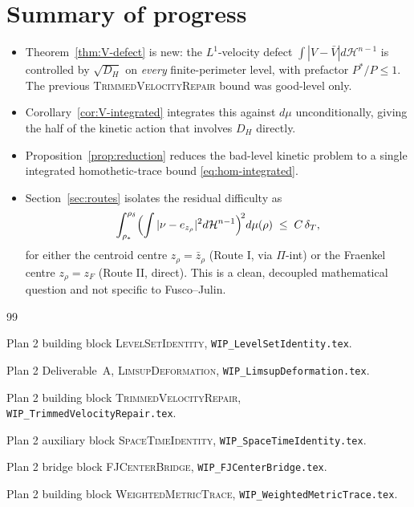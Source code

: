 \documentclass[11pt]{article}
\theoremstyle{definition}
\newcommand{\rstar}{\rho_{*}}
\newcommand{\rdel}{\rho_\delta}
\newcommand{\Hn}{\mathcal H^{n-1}}
\begin{document}
\section{Summary of progress}\label{sec:summary}

\begin{itemize}
\item Theorem~\ref{thm:V-defect} is new: the $L^{1}$-velocity defect
$\int|V-\bar V|d\Hn$ is controlled by $\sqrt{D_H}$ on \emph{every}
finite-perimeter level, with prefactor $P^{*}/P\le 1$.  The previous
\textsc{TrimmedVelocityRepair} bound was good-level only.
\item Corollary~\ref{cor:V-integrated} integrates this against
$d\mu$ unconditionally, giving the half of the kinetic action that
involves $D_H$ directly.
\item Proposition~\ref{prop:reduction} reduces the bad-level kinetic
problem to a single integrated homothetic-trace bound
\eqref{eq:hom-integrated}.
\item Section~\ref{sec:routes} isolates the residual difficulty as
\[
   \int_{\rstar}^{\rdel}\Bigl(\int|\nu-e_{z_\rho}|^{2}d\Hn\Bigr)^{\!2}d\mu(\rho)\;\le\;C\,\delta_T,
\]
for either the centroid centre $z_\rho=\bar z_\rho$ (Route I, via
$\Pi$-int) or the Fraenkel centre $z_\rho=z_F$ (Route II, direct).
This is a clean, decoupled mathematical question and not specific
to Fusco--Julin.
\end{itemize}

\begin{thebibliography}{99}

Plan 2 building block \textsc{LevelSetIdentity},
\texttt{WIP\_LevelSetIdentity.tex}.

Plan 2 Deliverable~A, \textsc{LimsupDeformation},
\texttt{WIP\_LimsupDeformation.tex}.

Plan 2 building block \textsc{TrimmedVelocityRepair},
\texttt{WIP\_TrimmedVelocityRepair.tex}.

Plan 2 auxiliary block \textsc{SpaceTimeIdentity},
\texttt{WIP\_SpaceTimeIdentity.tex}.

Plan 2 bridge block \textsc{FJCenterBridge},
\texttt{WIP\_FJCenterBridge.tex}.

Plan 2 building block \textsc{WeightedMetricTrace},
\texttt{WIP\_WeightedMetricTrace.tex}.

\end{thebibliography}
\end{document}
